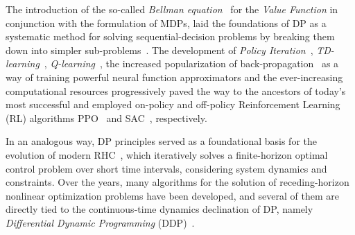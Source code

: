 The introduction of the so-called \textit{Bellman equation}~\cite{rl:bellman1960dynamic} for the \textit{Value Function} in conjunction with the formulation of MDPs, laid the foundations of DP as a systematic method for solving sequential-decision problems by breaking them down into simpler sub-problems~\cite{rl:bellman1960dynamic}. The development of \textit{Policy Iteration}~\cite{rl:howard1960dynamic}, \textit{TD-learning}~\cite{rl:barto1983neuronlike}, \textit{Q-learning}~\cite{rl:watkins1989learning}, the increased popularization of back-propagation~\cite{rl:rumelhart1986learning} as a way of training powerful neural function approximators and the ever-increasing computational resources progressively paved the way to the ancestors of today's most successful and employed on-policy and off-policy Reinforcement Learning (RL) algorithms PPO~\cite{rl:schulman2017proximal} and SAC~\cite{rl:haarnoja2018soft}, respectively. 

In an analogous way, DP principles served as a foundational basis for the evolution of modern RHC~\cite{modern_mpc:grandia2023perceptive}, which iteratively solves a finite-horizon optimal control problem over short time intervals, considering system dynamics and constraints. Over the years, many algorithms for the solution of receding-horizon nonlinear optimization problems have been developed, and several of them are directly tied to the continuous-time dynamics declination of DP, namely \textit{Differential Dynamic Programming} (DDP)~\cite{rhc:jacobson1970differential,rhc:todorov2005generalized,rhc:diehl2009efficient,rhc:tassa2012synthesis}.
